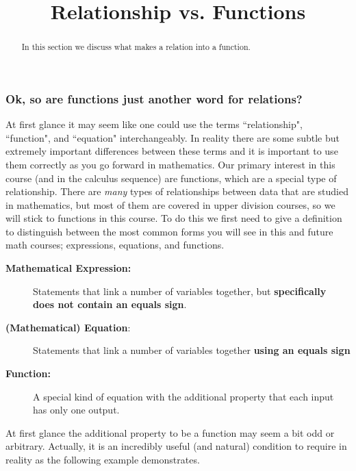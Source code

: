 \documentclass{ximeraXloud}
\title{Relationship vs. Functions}
\begin{document}
\begin{abstract}
    In this section we discuss what makes a relation into a function.
\end{abstract}
\maketitle

\subsubsection*{Ok, so are functions just another word for relations?}

    At first glance it may seem like one could use the terms ``relationship", ``function", and ``equation" interchangeably. In reality there are some subtle but extremely important differences between these terms and it is important to use them correctly as you go forward in mathematics. Our primary interest in this course (and in the calculus sequence) are functions, which are a special type of relationship. There are \textit{many} types of relationships between data that are studied in mathematics, but most of them are covered in upper division courses, so we will stick to functions in this course. To do this we first need to give a definition to distinguish between the most common forms you will see in this and future math courses; expressions, equations, and functions.
    
    \begin{description}
        \item[\textbf{Mathematical Expression:}] Statements that link a number of variables together, but \textbf{specifically does not contain an equals sign}.
        \item[\textbf{(Mathematical) Equation}:] Statements that link a number of variables together \textbf{using an equals sign}
        \item[\textbf{Function:}] A special kind of equation with the additional property that each input has only one output.
    \end{description}
    
    At first glance the additional property to be a function may seem a bit odd or arbitrary. Actually, it is an incredibly useful (and natural) condition to require in reality as the following example demonstrates.
    
\end{document}
